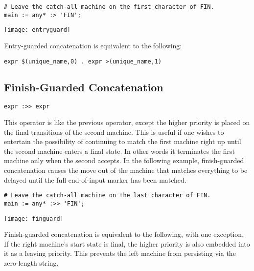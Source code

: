 \documentclass[letterpaper,11pt,oneside]{book}
\newcommand{\verbspace}{\vspace{10pt}}
\newcommand{\graphspace}{\vspace{10pt}}
\newenvironment{inline_code}{\def\baselinestretch{1}\vspace{12pt}\small}{}
\begin{document}
\begin{inline_code}
\begin{verbatim}
# Leave the catch-all machine on the first character of FIN.
main := any* :> 'FIN';
\end{verbatim}
\end{inline_code}

\graphspace
\begin{center}
\texttt{[image: entryguard]}
\end{center}
\graphspace

Entry-guarded concatenation is equivalent to the following:

\verbspace
\begin{verbatim}
expr $(unique_name,0) . expr >(unique_name,1)
\end{verbatim}

\subsection{Finish-Guarded Concatenation}

\verb|expr :>> expr|
\verbspace

This operator is
like the previous operator, except the higher priority is placed on the final
transitions of the second machine. This is useful if one wishes to entertain
the possibility of continuing to match the first machine right up until the
second machine enters a final state. In other words it terminates the first
machine only when the second accepts. In the following example, finish-guarded
concatenation causes the move out of the machine that matches everything to be
delayed until the full end-of-input marker has been matched.

\begin{inline_code}
\begin{verbatim}
# Leave the catch-all machine on the last character of FIN.
main := any* :>> 'FIN';
\end{verbatim}
\end{inline_code}

\graphspace
\begin{center}
\texttt{[image: finguard]}
\end{center}
\graphspace

Finish-guarded concatenation is equivalent to the following, with one
exception. If the right machine's start state is final, the higher priority is
also embedded into it as a leaving priority. This prevents the left machine
from persisting via the zero-length string.
\end{document}
